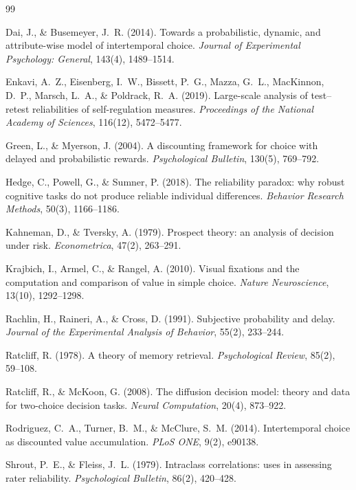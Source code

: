 \documentclass[11pt,a4paper]{article}
\begin{document}
\clearpage
\begin{thebibliography}{99}

Dai, J., \& Busemeyer, J.~R. (2014). Towards a probabilistic, dynamic, and attribute-wise model
of intertemporal choice. \emph{Journal of Experimental Psychology: General}, 143(4),
1489--1514.

Enkavi, A.~Z., Eisenberg, I.~W., Bissett, P.~G., Mazza, G.~L., MacKinnon, D.~P., Marsch,
L.~A., \& Poldrack, R.~A. (2019). Large-scale analysis of test--retest reliabilities of
self-regulation measures. \emph{Proceedings of the National Academy of Sciences}, 116(12),
5472--5477.

Green, L., \& Myerson, J. (2004). A discounting framework for choice with delayed and
probabilistic rewards. \emph{Psychological Bulletin}, 130(5), 769--792.

Hedge, C., Powell, G., \& Sumner, P. (2018). The reliability paradox: why robust cognitive
tasks do not produce reliable individual differences. \emph{Behavior Research Methods},
50(3), 1166--1186.

Kahneman, D., \& Tversky, A. (1979). Prospect theory: an analysis of decision under risk.
\emph{Econometrica}, 47(2), 263--291.

Krajbich, I., Armel, C., \& Rangel, A. (2010). Visual fixations and the computation and
comparison of value in simple choice. \emph{Nature Neuroscience}, 13(10), 1292--1298.

Rachlin, H., Raineri, A., \& Cross, D. (1991). Subjective probability and delay.
\emph{Journal of the Experimental Analysis of Behavior}, 55(2), 233--244.

Ratcliff, R. (1978). A theory of memory retrieval. \emph{Psychological Review}, 85(2),
59--108.

Ratcliff, R., \& McKoon, G. (2008). The diffusion decision model: theory and data for
two-choice decision tasks. \emph{Neural Computation}, 20(4), 873--922.

Rodriguez, C.~A., Turner, B.~M., \& McClure, S.~M. (2014). Intertemporal choice as discounted
value accumulation. \emph{PLoS ONE}, 9(2), e90138.

Shrout, P.~E., \& Fleiss, J.~L. (1979). Intraclass correlations: uses in assessing rater
reliability. \emph{Psychological Bulletin}, 86(2), 420--428.

\end{thebibliography}
\end{document}
